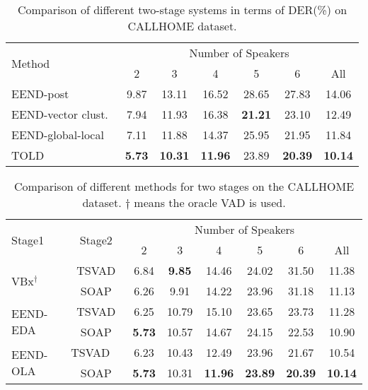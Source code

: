 \documentclass{article}
\begin{document}
\begin{table}[t!]
  \caption{Comparison of different two-stage systems in terms of DER(\%) on CALLHOME dataset.}
  \vspace{0.1cm}
  \label{tab:hybrid_callhome_der}
  \centering
  \setlength\tabcolsep{2.5pt}
  \begin{tabular}{l c c c c c c}
    \toprule 
    \multirow{2}{*}{Method} & \multicolumn{6}{c}{Number of Speakers}  \\
    \cmidrule(lr){2-7}
    & 2  & 3 & 4 & 5 & 6 & All \\
    \midrule
    EEND-post~\cite{EEND-post}                       & 9.87    & 13.11	& 16.52	& 28.65	& 27.83	& 14.06    \\
    EEND-vector clust.~\cite{EEND-vector-clust}                 & 7.94    & 11.93	& 16.38	& \textbf{21.21}	& 23.10	& 12.49    \\
    EEND-global-local~\cite{EEND-global-local}               & 7.11    & 11.88	& 14.37	& 25.95	& 21.95	& 11.84    \\
    \midrule
    TOLD                  & \textbf{5.73}	    & \textbf{10.31}	& \textbf{11.96}	& 23.89	& \textbf{20.39}	& \textbf{10.14}    \\
    \bottomrule
  \end{tabular}
  \vspace{-0.1cm}
\end{table}

\begin{table}[t!]
  \vspace{-0.2cm}
  \caption{Comparison of different methods for two stages on the CALLHOME dataset. $\dagger$ means the oracle VAD is used.}
  \vspace{0.1cm}
  \label{tab:callhome_der_compare}
  \centering
  \setlength\tabcolsep{2.5pt}
  \begin{tabular}{l c c c c c c c}
    \toprule 
    \multirow{2}{*}{Stage1} & \multirow{2}{*}{Stage2} & \multicolumn{6}{c}{Number of Speakers}  \\
    \cmidrule(lr){3-8}
    & & 2 & 3 & 4 & 5 & 6 & All \\
    \midrule
    \multirow{2}{*}{VBx$^\dagger$}  & TSVAD         & 6.84    & \textbf{9.85}    & 14.46   & 24.02 & 31.50 & 11.38    \\
      & SOAP          & 6.26    & 9.91    & 14.22  & 23.96 & 31.18 & 11.13    \\
    \midrule
    \multirow{2}{*}{EEND-EDA}  & TSVAD    & 6.25	  & 10.79   & 15.10   & 23.65 & 23.73 & 11.28    \\
& SOAP & \textbf{5.73} & 10.57 & 14.67 & 24.15 & 22.53 & 10.90 \\
    \midrule
    \multirow{2}{*}{EEND-OLA}~~ & TSVAD~~    & 6.23 & 10.43 & 12.49 & 23.96 & 21.67 & 10.54 \\
    & SOAP & \textbf{5.73} & 10.31 & \textbf{11.96}   & \textbf{23.89} & \textbf{20.39} & \textbf{10.14}    \\
    \bottomrule
  \end{tabular}
  \vspace{-0.3cm}
\end{table}
\end{document}
